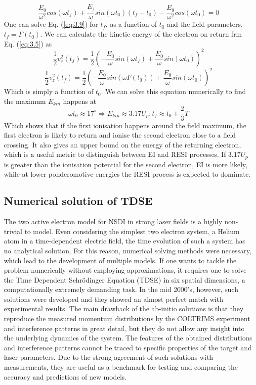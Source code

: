 \documentclass[11pt]{article}
\numberwithin{equation}{section}
\begin{document}
\begin{equation}\label{eq:3.9}
    \frac{E_0}{\omega^2} cos(\omega t_f) + \frac{E_)}{\omega} sin(\omega t_0)(t_f-t_0) - \frac{E_0}{\omega^2} cos(\omega t_0) = 0
\end{equation}
One can solve Eq. (\ref{eq:3.9}) for $t_f$, as a function of $t_0$ and the field parameters, $t_f = F(t_0)$. We can calculate the kinetic energy of the electron on return frm Eq. (\ref{eq:3.5}) as
\begin{equation}
    \frac{1}{2} v_z^2(t_f) = \frac{1}{2}\left(-\frac{E_0}{\omega} sin(\omega t_f) + \frac{E_0}{\omega} sin(\omega t_0)\right)^2
\end{equation}
\begin{equation}
    \frac{1}{2} v_z^2(t_f) = \frac{1}{2}\left(-\frac{E_0}{\omega} sin(\omega F(t_0)) + \frac{E_0}{\omega} sin(\omega t_0)\right)^2
\end{equation}
Which is simply a function of $t_0$. We can solve this equation numerically to find the maximum $E_{kin}$ happens at
\begin{equation}
    \omega t_0 \approx 17^{\circ} \Rightarrow E_{kin} \approx 3.17 U_p; t_f \approx t_0 + \frac{2}{3}T
\end{equation}
Which shows that if the first ionisation happens around the field maximum, the first electron is likely to return and ionise the second electron close to a field crossing. It also gives an upper bound on the energy of the returning electron, which is a useful metric to distinguish between EI and RESI processes. If $3.17 U_p$ is greater than the ionisation potential for the second electron, EI is more likely, while at lower ponderomotive energies the RESI process is expected to dominate. 
\subsection{Numerical solution of TDSE}
The two active electron model for NSDI in strong laser fields is a highly non-trivial to model. Even considering the simplest two electron system, a Helium atom in a time-dependent electric field, the time evolution of such a system has no analytical solution. For this reason, numerical solving methods were necessary, which lead to the development of multiple models. If one wants to tackle the problem numerically without employing approximations, it requires one to solve the Time Dependent Schrödinger Equation (TDSE) in six spatial dimensions, a computationally extremely demanding task. In the mid 2000's, however, such solutions were developed and they showed an almost perfect match with experimental results\cite{parker_2006_highenergy}. The main drawback of the ab-initio solutions is that they reproduce the measured momentum distributions by the COLTRIMS experiment and interference patterns in great detail, but they do not allow any insight into the underlying dynamics of the system. The features of the obtained distributions and interference patterns cannot be traced to specific properties of the target and laser parameters. Due to the strong agreement of such solutions with measurements, they are useful as a benchmark for testing and comparing the accuracy and predictions of new models. 
\end{document}
